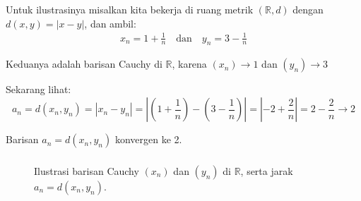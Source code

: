 \documentclass[aspectratio=169]{beamer}
\theoremstyle{definition}
\begin{document}
\begin{frame}
  \frametitle{\insertsection}
  \framesubtitle{\insertsubsection}
  Untuk ilustrasinya misalkan kita bekerja di ruang metrik \((\mathbb{R}, d)\) dengan \(d(x, y) = |x - y|\), dan ambil:
  \begin{align*}
    x_n = 1 + \frac{1}{n} \quad \text{dan} \quad y_n = 3 - \frac{1}{n}
  \end{align*}

Keduanya adalah barisan Cauchy di \(\mathbb{R}\), karena \((x_n) \to 1\) dan \((y_n) \to 3\)

Sekarang lihat:
\[
a_n = d(x_n, y_n)
= |x_n - y_n|
= \left| \left(1 + \frac{1}{n} \right) - \left(3 - \frac{1}{n} \right) \right|
= \left| -2 + \frac{2}{n} \right| = 2 - \frac{2}{n} \to 2
\]

Barisan \(a_n = d(x_n, y_n)\) konvergen ke 2.
\end{frame}

\begin{frame}
  \frametitle{\insertsection}
  \framesubtitle{\insertsubsection}
  \begin{figure}[h!]
    \caption{Ilustrasi barisan Cauchy $(x_n)$ dan $(y_n)$ di $\mathbb{R}$, serta jarak $a_n = d(x_n, y_n)$.}
    \end{figure}
\end{frame}
\end{document}
